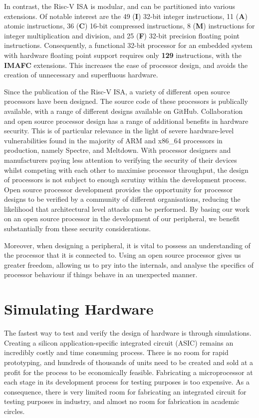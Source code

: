 \documentclass[a4paper,8pt]{report}
\begin{document}
In contrast, the Risc-V ISA is modular, and can be partitioned into various extensions. Of
notable interest are the 49 (\textbf{I}) 32-bit integer instructions, 11
(\textbf{A}) atomic instructions, 36 (\textbf{C}) 16-bit compressed instructions, 8
(\textbf{M}) instructions for integer multiplication and division, and 25
(\textbf{F}) 32-bit precision floating point instructions. Consequently, a
functional 32-bit processor for an embedded system with hardware floating point
support requires only \textbf{129} instructions, with the \textbf{IMAFC}
extensions. This increases the ease of processor design, and avoids the creation
of unnecessary and superfluous hardware. 


Since the publication of the Risc-V ISA\cite{Waterman:EECS-2014-54}, a variety of different open source
processors have been designed. The source code of these processors is publically
available, with a range of different designs available on GitHub. Collaboration
and open source processor design has a range of additional benefits in hardware
security. This is of particular relevance in the light of severe hardware-level
vulnerabilities found in the majority of ARM and x86\_64 processors in
production, namely Spectre, and Meltdown. With processor designers and
manufacturers paying less attention to verifying the security of their devices
whilst competing with each other to maximise processor throughput, the design of
processors is not subject to enough scrutiny within the development process.
Open source processor development provides the opportunity for processor designs
to be verified by a community of different organisations, reducing the
likelihood that architectural level attacks can be performed. By basing our work
on an open source processor in the development of our peripheral, we benefit
substantially from these security considerations.

Moreover, when designing a peripheral, it is vital to possess an understanding
of the processor that it is connected to. Using an open source processor gives
us greater freedom, allowing us to pry into the internals, and analyse the
specifics of processor behaviour if things behave in an unexpected manner.

\section{Simulating Hardware} 
The fastest way to test and verify the design of hardware is through simulations.
Creating a silicon application-specific integrated circuit (ASIC) remains an
incredibly costly and time consuming process.
There is no room for rapid prototyping, and hundreds of thousands of units need
to be created and sold at a profit for the process to be economically
feasible. Fabricating a microprocessor at each stage in its development process
for testing purposes is too expensive. As a consequence, there is very
limited room for fabricating an integrated circuit for testing purposes in
industry, and almost no room for fabrication in academic circles.
\end{document}
